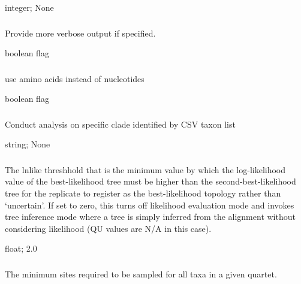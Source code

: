 \documentclass[letterpaper,12pt,english]{sphinxmanual}
\begin{document}
 integer;  None


\subsubsection{}
\label{\detokenize{prog_desc:v-verbose}}
 Provide more verbose output if specified.

 boolean flag


\subsubsection{}
\label{\detokenize{prog_desc:a-amino-acid}}
 use amino acids instead of nucleotides

 boolean flag


\subsubsection{}
\label{\detokenize{prog_desc:c-clade}}
 Conduct analysis on specific clade identified by CSV taxon list

 string;  None


\subsubsection{}
\label{\detokenize{prog_desc:l-lnlike-thresh}}
 The lnlike threshhold that is the minimum value by which the log-likelihood value of the best-likelihood tree must be higher than the second-best-likelihood tree for the replicate to register as the best-likelihood topology rather than ‘uncertain’. If set to zero, this turns off likelihood evaluation mode and invokes tree inference mode where a tree is simply inferred from the alignment without considering likelihood (QU values are N/A in this case).

 float;  2.0


\subsubsection{}
\label{\detokenize{prog_desc:o-min-overlap}}
 The minimum sites required to be sampled for all taxa in a given quartet.
\end{document}
